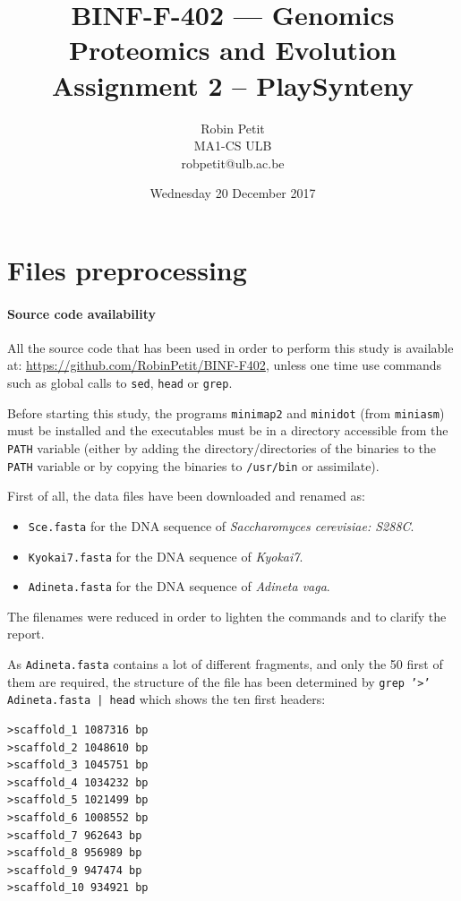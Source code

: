 \documentclass{article}
\title{BINF-F-402 --- Genomics Proteomics and Evolution\\Assignment 2 -- PlaySynteny}
\author{Robin Petit\\MA1-CS ULB\\robpetit@ulb.ac.be}
\date{Wednesday 20 December 2017}
\begin{document}
\maketitle
\tableofcontents

\section{Files preprocessing}

\paragraph{Source code availability} All the source code that has been used in order to perform
this study is available at: \url{https://github.com/RobinPetit/BINF-F402}, unless one time use
commands such as global calls to \texttt{sed}, \texttt{head} or \texttt{grep}.

Before starting this study, the programs \texttt{minimap2} and \texttt{minidot} (from \texttt{miniasm})
must be installed and the executables must be in a directory accessible from the \texttt{PATH} variable
(either by adding the directory/directories of the binaries to the \texttt{PATH} variable or by copying
the binaries to \texttt{/usr/bin} or assimilate).

First of all, the data files have been downloaded and renamed as:
\begin{itemize}
	\item \texttt{Sce.fasta} for the DNA sequence of \textit{Saccharomyces cerevisiae: S288C}.
	\item \texttt{Kyokai7.fasta} for the DNA sequence of \textit{Kyokai7}.
	\item \texttt{Adineta.fasta} for the DNA sequence of \textit{Adineta vaga}.
\end{itemize}

The filenames were reduced in order to lighten the commands and to clarify the report.

As \texttt{Adineta.fasta} contains a lot of different fragments, and only the 50 first of them are required,
the structure of the file has been determined by \texttt{grep '>' Adineta.fasta | head} which shows the ten
first headers:

\begin{lstlisting}
>scaffold_1 1087316 bp
>scaffold_2 1048610 bp
>scaffold_3 1045751 bp
>scaffold_4 1034232 bp
>scaffold_5 1021499 bp
>scaffold_6 1008552 bp
>scaffold_7 962643 bp
>scaffold_8 956989 bp
>scaffold_9 947474 bp
>scaffold_10 934921 bp
\end{lstlisting}
\end{document}
